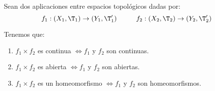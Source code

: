 \begin{teo}
    Sean dos aplicaciones entre espacios topológicos dadas por:
    \begin{equation*}
        f_1:(X_1,\T_1)\to (Y_1,\T_1') \hspace{1cm}
        f_2:(X_2,\T_2)\to (Y_2,\T_2')
    \end{equation*}

    Tenemos que:
    \begin{enumerate}
        \item $f_1\times f_2$ es continua $\Longleftrightarrow f_1$ y $f_2$ son continuas.
        \item $f_1\times f_2$ es abierta $\Longleftrightarrow f_1$ y $f_2$ son abiertas.
        \item $f_1\times f_2$ es un homeomorfismo $\Longleftrightarrow f_1$ y $f_2$ son homeomorfismos.
    \end{enumerate}
\end{teo}
